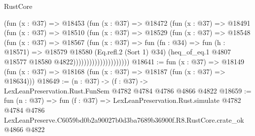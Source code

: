\begin{lexlean}{RustCore}
\begin{coremodule}
                            (fun (x : @37) =>
                            @18453
                              (fun (x : @37) =>
                              @18472
                                (fun (x : @37) =>
                                @18491
                                  (fun (x : @37) =>
                                  @18510
                                    (fun (x : @37) =>
                                    @18529
                                      (fun (x : @37) =>
                                      @18548
                                        (fun (x : @37) =>
                                        @18567
                                          (fun (x : @37) =>
                                          fun (fn : @34) =>
                                          fun (h : @18571) =>
                                          @18579
                                            @18580
                                            (Eq.refl.{2} (Sort 1) @34)
                                            (heq_of_eq.{1}
                                              @4807
                                              @18577
                                              @18580
                                              @4822)))))))))))))))))))))
@18641 := fun (x : @37) =>
  @18149 (fun (x : @37) => @18168 (fun (x : @37) => @18187 (fun (x : @37) => @18634)))
@18649 := (n : @37) -> (f : @37) -> LexLeanPreservation.Rust.FunSem @4782 @4784 @4786 @4866 @4822
@18659 := fun (n : @37) =>
  fun (f : @37) =>
  LexLeanPreservation.Rust.simulate
    @4782
    @4784
    @4786
    LexLeanPreserve.C6059bd0b2a90027b0d3ba7689b36900f.R8.RustCore.crate_ok
    @4866
    @4822
\end{coremodule}
\end{lexlean}

